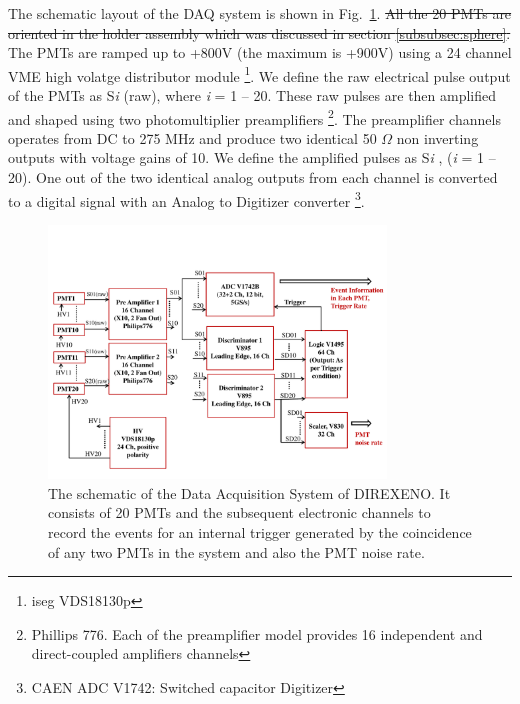 The schematic layout of the DAQ system is shown in Fig.~{\ref{Fig:DAQscheme}}. \sout{All the 20 PMTs are oriented in the holder assembly which was discussed in section \ref{subsubsec:sphere}.} The PMTs are ramped up to +800V (the maximum is +900V) using a 24 channel VME high volatge distributor module \footnote{iseg VDS18130p}. We define the raw electrical pulse output of the PMTs as S{\it i} (raw), where {\it i} = 1 -- 20. 
These raw pulses are then amplified and shaped using two photomultiplier preamplifiers \footnote{Phillips 776. Each of the preamplifier model provides 16 independent and direct-coupled amplifiers channels}. The preamplifier channels operates from DC to 275 MHz and produce two identical 50 $\Omega$ non inverting outputs with voltage gains of 10.  We define the amplified pulses as S{\it i} , ({\it i} = 1 -- 20). One out of the two identical analog outputs from each channel is converted to a digital signal with an Analog to Digitizer converter \footnote{CAEN ADC V1742: Switched capacitor Digitizer}. 
\begin{figure}[t]
   \centering
   \includegraphics[width=0.8\textwidth]{DAQscheme.pdf}
   \caption{The schematic of the Data Acquisition System of DIREXENO. It 
        consists of 20 PMTs and the subsequent electronic channels to record 
        the events for an internal trigger generated by the coincidence of any 
        two PMTs in the system and also the PMT noise rate.}
   \label{Fig:DAQscheme}
\end{figure}

